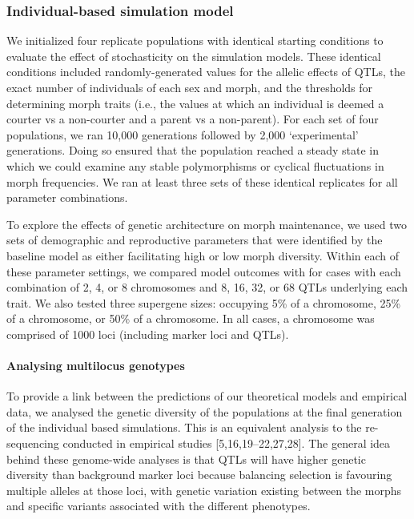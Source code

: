 \documentclass[
  11pt,
  a4paper,
]{article}
\begin{document}
\hypertarget{individual-based-simulation-model}{%
\subsubsection{Individual-based simulation model}\label{individual-based-simulation-model}}

We initialized four replicate populations with identical starting
conditions to evaluate the effect of stochasticity on the simulation
models. These identical conditions included randomly-generated values
for the allelic effects of QTLs, the exact number of individuals of each
sex and morph, and the thresholds for determining morph traits (i.e.,
the values at which an individual is deemed a courter vs a non-courter
and a parent vs a non-parent). For each set of four populations, we ran
10,000 generations followed by 2,000 `experimental' generations. Doing
so ensured that the population reached a steady state in which we could
examine any stable polymorphisms or cyclical fluctuations in morph
frequencies. We ran at least three sets of these identical replicates
for all parameter combinations.

To explore the effects of genetic architecture on morph maintenance, we
used two sets of demographic and reproductive parameters that were
identified by the baseline model as either facilitating high or low
morph diversity. Within each of these parameter settings, we compared
model outcomes with for cases with each combination of 2, 4, or 8
chromosomes and 8, 16, 32, or 68 QTLs underlying each trait. We also
tested three supergene sizes: occupying 5\% of a chromosome, 25\% of a
chromosome, or 50\% of a chromosome. In all cases, a chromosome was
comprised of 1000 loci (including marker loci and QTLs).

\hypertarget{analysing-multilocus-genotypes}{%
\paragraph{Analysing multilocus genotypes}\label{analysing-multilocus-genotypes}}

To provide a link between the predictions of our theoretical models and
empirical data, we analysed the genetic diversity of the populations at
the final generation of the individual based simulations. This is an
equivalent analysis to the re-sequencing conducted in empirical studies
{[}5,16,19--22,27,28{]}. The general idea behind
these genome-wide analyses is that QTLs will have higher genetic
diversity than background marker loci because balancing selection is
favouring multiple alleles at those loci, with genetic variation
existing between the morphs and specific variants associated with the
different phenotypes.
\end{document}
